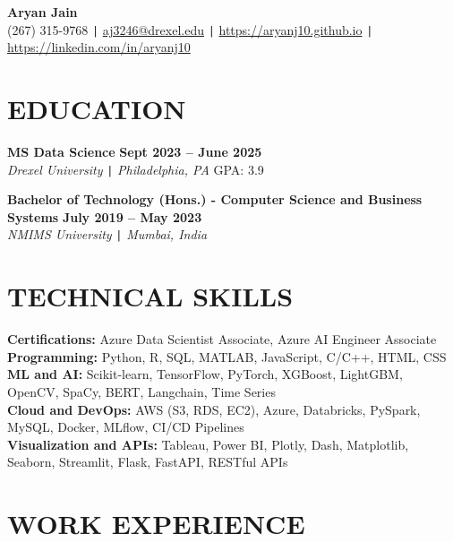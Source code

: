 \documentclass[10pt]{article}
\begin{document}
\begin{center}
    \textbf{\fontsize{18}{18}\selectfont Aryan Jain} \\
    (267) 315-9768 \texttt{|} \href{mailto:aj3246@drexel.edu}{aj3246@drexel.edu} \texttt{|}
    \href{https://aryanj10.github.io}{https://aryanj10.github.io} \texttt{|}  
    \href{https://linkedin.com/in/aryanj10}{https://linkedin.com/in/aryanj10}
\end{center}

\vspace{-0.7cm}
\section*{EDUCATION} 
\vspace{-0.2cm} 

\noindent 
\textbf{MS Data Science} \hfill \textbf{Sept 2023 -- June 2025} \\
\textit{Drexel University} \texttt{|} \textit{Philadelphia, PA} \hfill GPA: 3.9

\noindent 
\textbf{Bachelor of Technology (Hons.) - Computer Science and Business Systems} \hfill \textbf{July 2019 --  May 2023} \\
\textit{NMIMS University} \texttt{|} \textit{Mumbai, India} 


\vspace{-0.4cm} 
\section*{TECHNICAL SKILLS} 
\vspace{-0.2cm}
\noindent
\textbf{Certifications:} Azure Data Scientist Associate, Azure AI Engineer Associate \\
\textbf{Programming:} Python, R, SQL, MATLAB, JavaScript, C/C++, HTML, CSS \\
\textbf{ML and AI:} Scikit-learn, TensorFlow, PyTorch, XGBoost, LightGBM, OpenCV, SpaCy, BERT, Langchain, Time Series \\
\textbf{Cloud and DevOps:} AWS (S3, RDS, EC2), Azure, Databricks, PySpark, MySQL, Docker, MLflow, CI/CD Pipelines \\
\textbf{Visualization and APIs:} Tableau, Power BI, Plotly, Dash, Matplotlib, Seaborn, Streamlit, Flask, FastAPI, RESTful APIs

\vspace{-0.4cm}
\section*{WORK EXPERIENCE}
\end{document}
